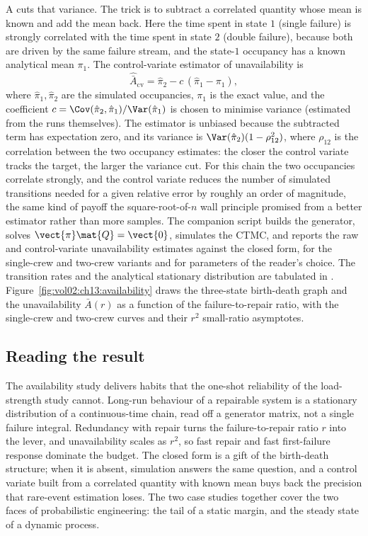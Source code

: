 A  cuts that variance. The trick is to subtract
a correlated quantity whose mean is known and add the mean back. Here the
time spent in state $1$ (single failure) is strongly correlated with the
time spent in state $2$ (double failure), because both are driven by the
same failure stream, and the state-$1$ occupancy has a known analytical
mean $\pi_{1}$. The control-variate estimator of unavailability is
\[
\hat{\bar A}_{\mathrm{cv}} = \hat\pi_{2}
- c\,(\hat\pi_{1} - \pi_{1}),
\]
where $\hat\pi_{1}, \hat\pi_{2}$ are the simulated occupancies, $\pi_{1}$
is the exact value, and the coefficient $c = \Cov(\hat\pi_{2},
\hat\pi_{1})/\Var(\hat\pi_{1})$ is chosen to minimise variance (estimated
from the runs themselves). The estimator is unbiased because the
subtracted term has expectation zero, and its variance is
$\Var(\hat\pi_{2})(1 - \rho^{2}_{12})$, where $\rho_{12}$ is the
correlation between the two occupancy estimates: the closer the control
variate tracks the target, the larger the variance cut. For this chain
the two occupancies correlate strongly, and the control variate reduces
the number of simulated transitions needed for a given relative error by
roughly an order of magnitude, the same kind of payoff the
square-root-of-$n$ wall principle promised from a better estimator
rather than more samples. The companion script
builds the generator, solves $\vect{\pi}\mat{Q} = \vect{0}$, simulates
the CTMC, and reports the raw and control-variate unavailability
estimates against the closed form, for the single-crew and two-crew
variants and for parameters of the reader's choice. The transition
rates and the analytical stationary distribution are tabulated in
.
Figure~\ref{fig:vol02:ch13:availability} draws the three-state
birth-death graph and the unavailability $\bar A(r)$ as a function of
the failure-to-repair ratio, with the single-crew and two-crew curves
and their $r^{2}$ small-ratio asymptotes.



\subsection{Reading the result}

The availability study delivers habits that the one-shot reliability of
the load-strength study cannot. Long-run behaviour of a repairable
system is a stationary distribution of a continuous-time chain, read off
a generator matrix, not a single failure integral. Redundancy with
repair turns the failure-to-repair ratio $r$ into the lever, and
unavailability scales as $r^{2}$, so fast repair and fast first-failure
response dominate the budget. The closed form is a gift of the
birth-death structure; when it is absent, simulation answers the same
question, and a control variate built from a correlated quantity with
known mean buys back the precision that rare-event estimation loses. The
two case studies together cover the two faces of probabilistic
engineering: the tail of a static margin, and the steady state of a
dynamic process.


